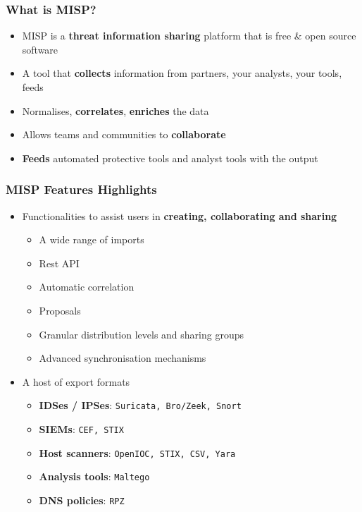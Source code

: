 \begin{frame}
\frametitle{What is MISP?}
\begin{itemize}
       \item MISP is a {\bf threat information sharing} platform that is free \& open source software
       \item A tool that {\bf collects} information from partners, your analysts, your tools, feeds
       \item Normalises, {\bf correlates}, {\bf enriches} the data
       \item Allows teams and communities to {\bf collaborate}
       \item {\bf Feeds} automated protective tools and analyst tools with the output
\end{itemize}
\end{frame}

\begin{frame}
\frametitle{MISP Features Highlights}
    \begin{itemize}
        \item Functionalities to assist users in {\bf creating, collaborating and sharing}
        \begin{itemize}
            \item A wide range of imports
            \item Rest API
            \item Automatic correlation
            \item Proposals
            \item Granular distribution levels and sharing groups
            \item Advanced synchronisation mechanisms
        \end{itemize}
        \item A host of export formats
        \begin{itemize}
            \item {\bf IDSes / IPSes}: \texttt{Suricata, Bro/Zeek, Snort}
            \item {\bf SIEMs}: \texttt{CEF, STIX} 
            \item {\bf Host scanners}:  \texttt{OpenIOC, STIX, CSV, Yara}
            \item {\bf Analysis tools}: \texttt{Maltego}
            \item {\bf DNS policies}: \texttt{RPZ}
        \end{itemize}
    \end{itemize}
\end{frame}

